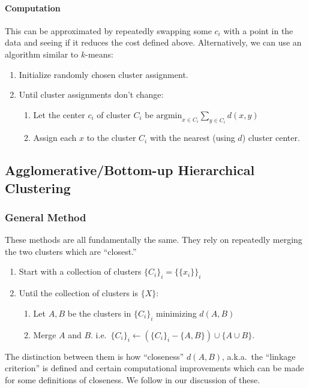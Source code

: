 \documentclass[12pt,a4paper]{article}
\newcommand{\1}[1]{\mathds{1}\left[#1\right]}
\begin{document}
\paragraph{Computation}
This can be approximated by repeatedly swapping some $c_i$ with a point in the data and seeing if it reduces the cost defined above. Alternatively, we can use an algorithm similar to $k$-means: \cite{esl}
\begin{enumerate}
    \item Initialize randomly chosen cluster assignment.
    \item Until cluster assignments don't change:
        \begin{enumerate}
        \item Let the center $c_i$ of cluster $C_i$ be $\mathrm{argmin}_{x\in C_i}\sum_{y\in C_i}d(x,y)$ 
        \item Assign each $x$ to the cluster $C_i$ with the nearest (using $d$) cluster center.
        \end{enumerate}
\end{enumerate}

\subsection{Agglomerative/Bottom-up Hierarchical Clustering}

\subsubsection{General Method}
These methods are all fundamentally the same. They rely on repeatedly merging the two clusters which are ``closest.''
\begin{enumerate}
    \item Start with a collection of clusters $\{C_i\}_i=\{\{x_i\}\}_i$
    \item Until the collection of clusters is $\{X\}$:
        \begin{enumerate}
            \item Let $A,B$ be the clusters in $\{C_i\}_i$ minimizing $d(A,B)$
            \item Merge $A$ and $B$. i.e.~$\{C_i\}_i\leftarrow (\{C_i\}_i-\{A,B\})\cup \{A\cup B\}$.
        \end{enumerate}
\end{enumerate}
The distinction between them is how ``closeness'' $d(A,B)$, a.k.a.~the ``linkage criterion'' is defined and certain computational improvements which can be made for some definitions of closeness. We follow \cite{clusteranalysis} in our discussion of these.
\end{document}
